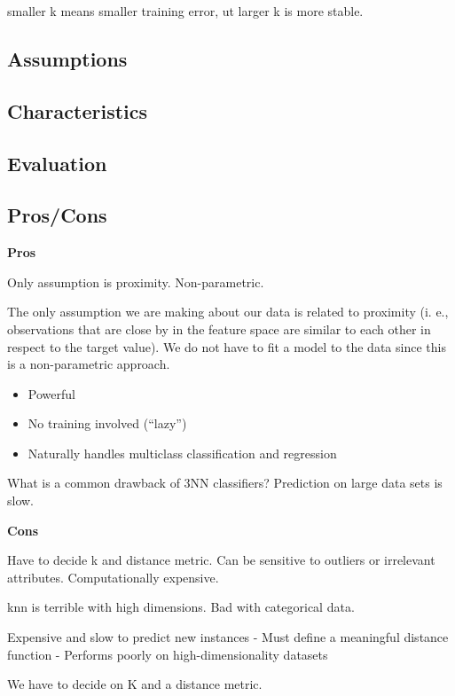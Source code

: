 \documentclass[]{book}
\providecommand{\tightlist}{%
  \setlength{\itemsep}{0pt}\setlength{\parskip}{0pt}}
\theoremstyle{definition}
\theoremstyle{definition}
\theoremstyle{definition}
\theoremstyle{remark}
\begin{document}
smaller k means smaller training error, ut larger k is more stable.

\subsection{Assumptions}\label{assumptions-11}

\subsection{Characteristics}\label{characteristics-6}

\subsection{Evaluation}\label{evaluation-11}

\subsection{Pros/Cons}\label{proscons-11}

\textbf{Pros}

Only assumption is proximity. Non-parametric.

The only assumption we are making about our data is related to proximity
(i. e., observations that are close by in the feature space are similar
to each other in respect to the target value). We do not have to fit a
model to the data since this is a non-parametric approach.

\begin{itemize}
\tightlist
\item
  Powerful
\item
  No training involved (``lazy'')
\item
  Naturally handles multiclass classification and regression
\end{itemize}

What is a common drawback of 3NN classifiers? Prediction on large data
sets is slow.

\textbf{Cons}

Have to decide k and distance metric. Can be sensitive to outliers or
irrelevant attributes. Computationally expensive.

knn is terrible with high dimensions. Bad with categorical data.

Expensive and slow to predict new instances - Must define a meaningful
distance function - Performs poorly on high-dimensionality datasets

We have to decide on K and a distance metric.
\end{document}
